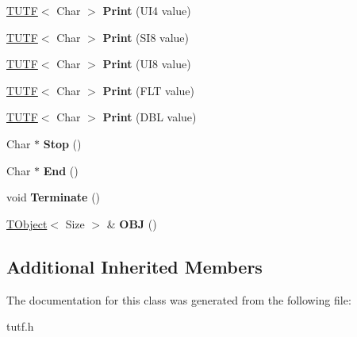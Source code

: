 \begin{DoxyCompactItemize}
\mbox{\hyperlink{struct___1_1_t_u_t_f}{T\+U\+TF}}$<$ Char $>$ {\bfseries Print} (U\+I4 value)
\item 
\mbox{\label{class___1_1_t_string_aafc07eecd77440f9fbc1a76a7028ce49}} 
\mbox{\hyperlink{struct___1_1_t_u_t_f}{T\+U\+TF}}$<$ Char $>$ {\bfseries Print} (S\+I8 value)
\item 
\mbox{\label{class___1_1_t_string_a75eda5a9eeac3d39fe6ed869935b5a09}} 
\mbox{\hyperlink{struct___1_1_t_u_t_f}{T\+U\+TF}}$<$ Char $>$ {\bfseries Print} (U\+I8 value)
\item 
\mbox{\label{class___1_1_t_string_a99f91282240a4bd6e84bbaec5d02ded7}} 
\mbox{\hyperlink{struct___1_1_t_u_t_f}{T\+U\+TF}}$<$ Char $>$ {\bfseries Print} (F\+LT value)
\item 
\mbox{\label{class___1_1_t_string_afec554f47c9360f1ee0fae7e68dcd935}} 
\mbox{\hyperlink{struct___1_1_t_u_t_f}{T\+U\+TF}}$<$ Char $>$ {\bfseries Print} (D\+BL value)
\item 
\mbox{\label{class___1_1_t_string_adc42054abf47fc70970d36cb961a666f}} 
Char $\ast$ {\bfseries Stop} ()
\item 
\mbox{\label{class___1_1_t_string_af7c39101f3d7de432cc0b8fc0fa251e9}} 
Char $\ast$ {\bfseries End} ()
\item 
\mbox{\label{class___1_1_t_string_a5170ce88b863a2ca5d8d186542d031df}} 
void {\bfseries Terminate} ()
\item 
\mbox{\label{class___1_1_t_string_ac201aaf06055455e4cb6ec42a5cad4b4}} 
\mbox{\hyperlink{class___1_1_t_object}{T\+Object}}$<$ Size $>$ \& {\bfseries O\+BJ} ()
\end{DoxyCompactItemize}
\subsection*{Additional Inherited Members}


The documentation for this class was generated from the following file\+:\begin{DoxyCompactItemize}
\item 
tutf.\+h\end{DoxyCompactItemize}
